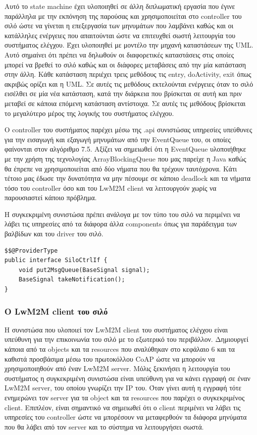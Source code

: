 Αυτό το state machine έχει υλοποιηθεί σε άλλη διπλωματική εργασία που έγινε παράλληλα με την εκπόνηση της παρούσας και χρησιμοποιείται στο controller του σιλό ώστε να γίνεται η επεξεργασία των μηνυμάτων που λαμβάνει καθώς και οι κατάλληλες ενέργειες που απαιτούνται ώστε να επιτευχθεί σωστή λειτουργία του συστήματος ελέγχου. Έχει υλοποιηθεί με μοντέλο την μηχανή καταστάσεων της UML. Αυτό σημαίνει ότι πρέπει να δηλωθούν οι διαφορετικές καταστάσεις στις οποίες μπορεί να βρεθεί το σιλό καθώς και οι διάφορες μεταβάσεις από την μία κατάσταση στην άλλη. Κάθε κατάσταση περιέχει τρεις μεθόδους τις entry, doActivity, exit όπως ακριβώς ορίζει και η UML. Σε αυτές τις μεθόδους εκτελούνται ενέργειες όταν το σιλό εισέλθει σε μία νέα κατάσταση, κατά την διάρκεια που βρίσκεται σε αυτή και πριν μεταβεί σε κάποια επόμενη κατάσταση αντίστοιχα. Σε αυτές τις μεθόδους βρίσκεται το μεγαλύτερο μέρος της λογικής του συστήματος ελέγχου. 

	
	Ο controller του συστήματος παρέχει μέσω της .api συνιστώσας υπηρεσίες υπεύθυνες για την εισαγωγή και εξαγωγή μηνυμάτων από την EventQueue του, οι οποίες φαίνονται στον αλγόριθμο 7.5. Αξίζει να σημειωθεί ότι η EventQueue υλοποιήθηκε με την χρήση της τεχνολογίας ArrayBlockingQueue που μας παρείχε η Java καθώς θα έπρεπε να χρησιμοποιείται από δύο νήματα που θα τρέχουν ταυτόχρονα. Κάτι τέτοιο μας έδωσε την δυνατότητα να μην πέσουμε σε κάποιο deadlock και τα νήματα τόσο του controller όσο και του LwM2M client να λειτουργούν χωρίς να παρουσιαστεί κάποιο πρόβλημα. 

	Η συγκεκριμένη συνιστώσα πρέπει ανάλογα με τον τύπο του σιλό να περιμένει να λάβει τις υπηρεσίες από τα διάφορα άλλα components όπως για παράδειγμα των βαλβίδων και του driver του σιλό. 
	
\begin{lstlisting}[caption=Οι υπηρεσίες που παρέχει η συνιστώσα του ελεγκτή του σιλό]
$$@ProviderType
public interface SiloCtrlIf {
    void put2MsgQueue(BaseSignal signal);
    BaseSignal takeNotification();
}

\end{lstlisting}


\subsubsection{Ο LwM2M client του σιλό}
Η συνιστώσα που υλοποιεί τον LwM2M  client του συστήματος ελέγχου είναι υπεύθυνη για την επικοινωνία του σιλό με το εξωτερικό του περιβάλλον. Δημιουργεί κάποια από τα objects και τα resources που αναλύθηκαν στο κεφάλαιο 6 και τα καθιστά προσβάσιμα μέσω του πρωτοκόλλου CoAP ώστε να μπορούν να χρησιμοποιηθούν από έναν LwM2M server. Μόλις ξεκινήσει η λειτουργία του συστήματος η συγκεκριμένη συνιστώσα είναι υπεύθυνη για να κάνει εγγραφή σε έναν LwM2M server, του οποίου γνωρίζει την IP του. Όταν γίνει αυτή η εγγραφή τότε ενημερώνει τον server για τα object και τα resources που παρέχει ο συγκεκριμένος client. Επιπλέον, είναι σημαντικό να σημειωθεί ότι ο client περιμένει να λάβει τις υπηρεσίες του controller ώστε να μπορέσουν να μεταφερθούν τα διάφορα μηνύματα που θα λάβει από τον server και το σύστημα να λειτουργήσει σωστά. 

